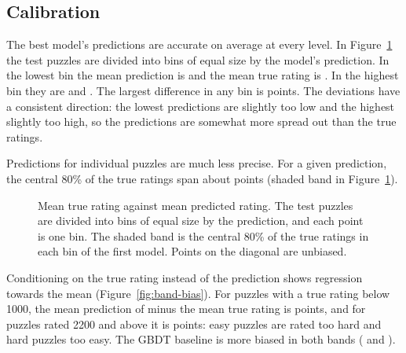 \documentclass[11pt]{article}
\begin{document}
\begin{table}[htbp]\centering\small
{}
\caption{Distribution of the absolute errors on the test set: the median,
the 90th percentile, and the share of predictions within 100, 200 and 300
rating points of the true rating.}
\label{tab:closeness}
\end{table}

\subsection{Calibration}

The best model's predictions are accurate on average at every level. In
Figure~\ref{fig:reliability} the test puzzles are divided into
 bins of equal size by the model's prediction. In
the lowest bin the mean prediction is  and
the mean true rating is . In the highest
bin they are  and
. The largest difference in any bin is
 points. The deviations have a consistent
direction: the lowest predictions are slightly too low and the highest
slightly too high, so the predictions are somewhat more spread out than the
true ratings.

Predictions for individual puzzles are much less precise. For a given
prediction, the central 80\% of the true ratings span about
 points (shaded band in
Figure~\ref{fig:reliability}).

\begin{figure}[htbp]\centering
{}
\caption{Mean true rating against mean predicted rating. The test puzzles
are divided into bins of equal size by the prediction, and each point is one
bin. The shaded band is the central 80\% of the true ratings in each bin of
the first model. Points on the diagonal are unbiased.}
\label{fig:reliability}
\end{figure}

Conditioning on the true rating instead of the prediction shows regression
towards the mean (Figure~\ref{fig:band-bias}). For puzzles with a true rating
below 1000, the mean prediction of  minus the mean true
rating is  points, and for puzzles rated
2200 and above it is  points: easy
puzzles are rated too hard and hard puzzles too easy. The GBDT baseline is more biased in both
bands ( and
).
\end{document}
